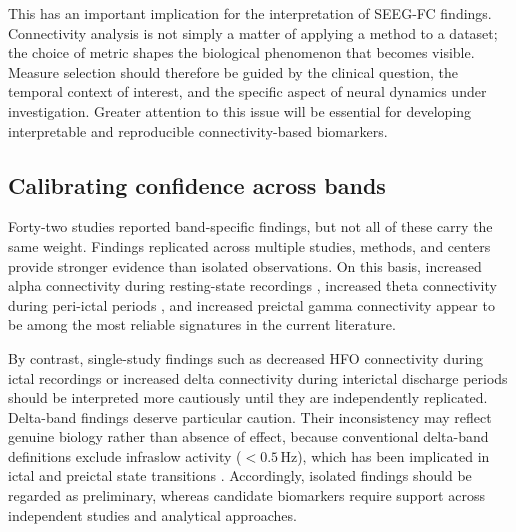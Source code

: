 \documentclass[12pt]{article}
\begin{document}
This has an important implication for the interpretation of SEEG-FC findings. Connectivity analysis is not simply a matter of applying a method to a dataset; the choice of metric shapes the biological phenomenon that becomes visible. Measure selection should therefore be guided by the clinical question, the temporal context of interest, and the specific aspect of neural dynamics under investigation. Greater attention to this issue will be essential for developing interpretable and reproducible connectivity-based biomarkers.

\subsection{Calibrating confidence across bands}
Forty-two studies reported band-specific findings, but not all of these carry the same weight. Findings replicated across multiple studies, methods, and centers provide stronger evidence than isolated observations. On this basis, increased alpha connectivity during resting-state recordings \cite{Goodale2020-lj, Narasimhan2020-af, Paulo2022-pt, Soncin2024-iz}, increased theta connectivity during peri-ictal periods \cite{Coelli2019-hu, Hu2023-kr, Krishnan2024-sq}, and increased preictal gamma connectivity \cite{Xu2025-lh, Li2025-os, Ivankovic2025-ng} appear to be among the most reliable signatures in the current literature.

By contrast, single-study findings such as decreased HFO connectivity during ictal recordings \cite{Xu2023-rm} or increased delta connectivity during interictal discharge periods \cite{Xu2025-lh} should be interpreted more cautiously until they are independently replicated. Delta-band findings deserve particular caution. Their inconsistency may reflect genuine biology rather than absence of effect, because conventional delta-band definitions exclude infraslow activity ($<0.5$\,Hz), which has been implicated in ictal and preictal state transitions \cite{Thompson2016-qs}. Accordingly, isolated findings should be regarded as preliminary, whereas candidate biomarkers require support across independent studies and analytical approaches.
\end{document}
